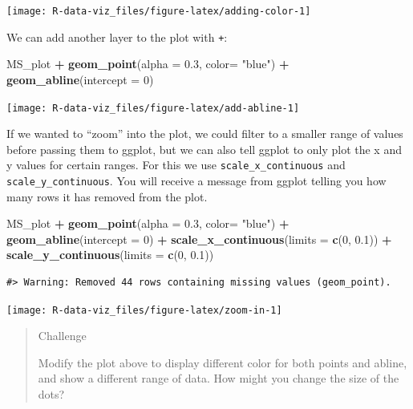 \documentclass[]{book}
\newenvironment{Shaded}{\begin{snugshade}}{\end{snugshade}}
\newcommand{\KeywordTok}[1]{\textcolor[rgb]{0.13,0.29,0.53}{\textbf{#1}}}
\newcommand{\DataTypeTok}[1]{\textcolor[rgb]{0.13,0.29,0.53}{#1}}
\newcommand{\DecValTok}[1]{\textcolor[rgb]{0.00,0.00,0.81}{#1}}
\newcommand{\FloatTok}[1]{\textcolor[rgb]{0.00,0.00,0.81}{#1}}
\newcommand{\StringTok}[1]{\textcolor[rgb]{0.31,0.60,0.02}{#1}}
\newcommand{\OperatorTok}[1]{\textcolor[rgb]{0.81,0.36,0.00}{\textbf{#1}}}
\newcommand{\NormalTok}[1]{#1}
\theoremstyle{definition}
\theoremstyle{definition}
\theoremstyle{definition}
\theoremstyle{remark}
\begin{document}
\texttt{[image: R-data-viz\_files/figure-latex/adding-color-1]}

We can add another layer to the plot with \texttt{+}:

\begin{Shaded}
\begin{Highlighting}[]
\NormalTok{MS_plot }\OperatorTok{+}\StringTok{ }
\StringTok{  }\KeywordTok{geom_point}\NormalTok{(}\DataTypeTok{alpha =} \FloatTok{0.3}\NormalTok{, }\DataTypeTok{color=} \StringTok{"blue"}\NormalTok{) }\OperatorTok{+}
\StringTok{  }\KeywordTok{geom_abline}\NormalTok{(}\DataTypeTok{intercept =} \DecValTok{0}\NormalTok{)}
\end{Highlighting}
\end{Shaded}

\texttt{[image: R-data-viz\_files/figure-latex/add-abline-1]}

If we wanted to ``zoom'' into the plot, we could filter to a smaller
range of values before passing them to ggplot, but we can also tell
ggplot to only plot the x and y values for certain ranges. For this we
use \texttt{scale\_x\_continuous} and \texttt{scale\_y\_continuous}. You
will receive a message from ggplot telling you how many rows it has
removed from the plot.

\begin{Shaded}
\begin{Highlighting}[]
\NormalTok{MS_plot }\OperatorTok{+}\StringTok{ }
\StringTok{  }\KeywordTok{geom_point}\NormalTok{(}\DataTypeTok{alpha =} \FloatTok{0.3}\NormalTok{, }\DataTypeTok{color=} \StringTok{"blue"}\NormalTok{) }\OperatorTok{+}
\StringTok{  }\KeywordTok{geom_abline}\NormalTok{(}\DataTypeTok{intercept =} \DecValTok{0}\NormalTok{) }\OperatorTok{+}\StringTok{ }
\StringTok{  }\KeywordTok{scale_x_continuous}\NormalTok{(}\DataTypeTok{limits =} \KeywordTok{c}\NormalTok{(}\DecValTok{0}\NormalTok{, }\FloatTok{0.1}\NormalTok{)) }\OperatorTok{+}
\StringTok{  }\KeywordTok{scale_y_continuous}\NormalTok{(}\DataTypeTok{limits =} \KeywordTok{c}\NormalTok{(}\DecValTok{0}\NormalTok{, }\FloatTok{0.1}\NormalTok{)) }
\end{Highlighting}
\end{Shaded}

\begin{verbatim}
#> Warning: Removed 44 rows containing missing values (geom_point).
\end{verbatim}

\texttt{[image: R-data-viz\_files/figure-latex/zoom-in-1]}

\begin{quote}
Challenge

Modify the plot above to display different color for both points and
abline, and show a different range of data. How might you change the
size of the dots?
\end{quote}
\end{document}
